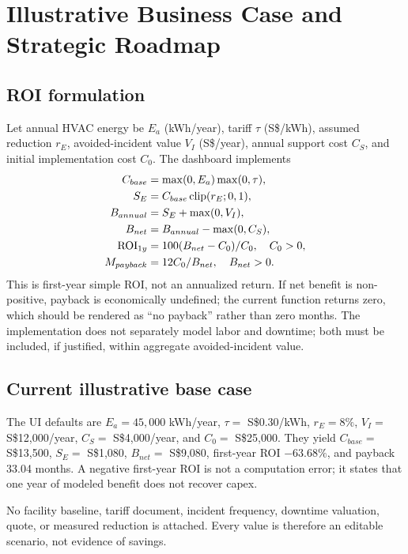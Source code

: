 \chapter{Illustrative Business Case and Strategic Roadmap}
\label{ch:roi}

\section{ROI formulation}
Let annual HVAC energy be $E_a$ (kWh/year), tariff $\tau$ (S\$/kWh), assumed reduction $r_E$, avoided-incident value $V_I$ (S\$/year), annual support cost $C_S$, and initial implementation cost $C_0$. The dashboard implements
\begin{align}
C_{base}&=\max(0,E_a)\max(0,\tau),\\
S_E&=C_{base}\operatorname{clip}(r_E;0,1),\\
B_{annual}&=S_E+\max(0,V_I),\\
B_{net}&=B_{annual}-\max(0,C_S),\\
\mathrm{ROI}_{1y}&=100(B_{net}-C_0)/C_0,\quad C_0>0,\\
M_{payback}&=12C_0/B_{net},\quad B_{net}>0.
\end{align}
This is first-year simple ROI, not an annualized return. If net benefit is non-positive, payback is economically undefined; the current function returns zero, which should be rendered as ``no payback'' rather than zero months. The implementation does not separately model labor and downtime; both must be included, if justified, within aggregate avoided-incident value.

\section{Current illustrative base case}
The UI defaults are $E_a=45{,}000$ kWh/year, $\tau=$ S\$0.30/kWh, $r_E=8\%$, $V_I=$ S\$12,000/year, $C_S=$ S\$4,000/year, and $C_0=$ S\$25,000. They yield $C_{base}=$ S\$13,500, $S_E=$ S\$1,080, $B_{net}=$ S\$9,080, first-year ROI $-63.68\%$, and payback 33.04 months. A negative first-year ROI is not a computation error; it states that one year of modeled benefit does not recover capex.

No facility baseline, tariff document, incident frequency, downtime valuation, quote, or measured reduction is attached. Every value is therefore an editable scenario, not evidence of savings.

